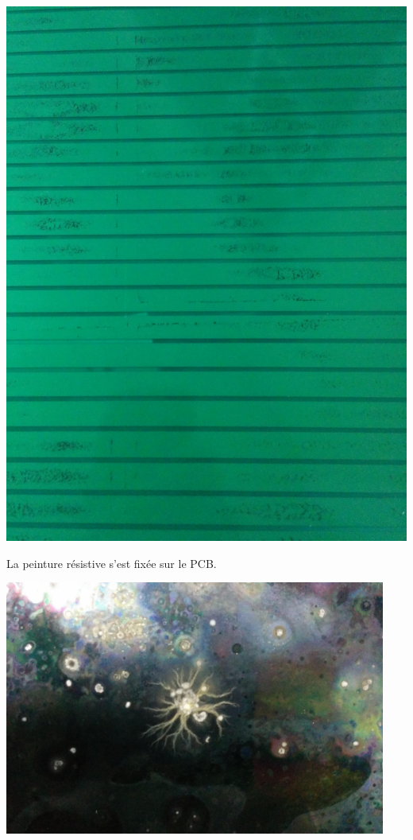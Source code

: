 \noindent
\begin{minipage}[th!]{1\textwidth}
	\addtocounter{figure}{1}
	\centering
	\noindent
	\begin{minipage}[th!]{0.48\textwidth}
		\noindent
		\centering
		\begin{minipage}[th!]{1\textwidth}
			\noindent
			\centering
			\includegraphics[width=1\textwidth]{GLA/peinture.jpg}
		\end{minipage}%
		\renewcommand\thesubfigure{(\alph{subfigure})}
		\captionsetup{type=subfigure}\caption{La peinture résistive s'est fixée sur le PCB.}
		\label{peinture}
	\end{minipage}%
	\hfill
	\begin{minipage}[th!]{0.48\textwidth}
		\noindent
		\centering
			\begin{minipage}[th!]{1\textwidth}
		\noindent
		\centering
		\includegraphics[width=0.94\textwidth]{GLA/depot2.jpg}

\end{minipage}
\end{minipage}
\end{minipage}
